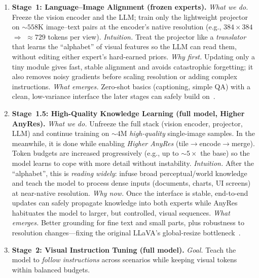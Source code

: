 \begin{enrichment}
\begin{enrichment}
\begin{enumerate}
            \item \textbf{Stage~1: Language--Image Alignment (frozen experts).}
            \emph{What we do.} Freeze the vision encoder and the LLM; train only the lightweight projector on ${\sim}558\text{K}$ image--text pairs at the encoder’s native resolution (e.g., $384{\times}384$ $\Rightarrow$ $\approx729$ tokens per view).  
            \emph{Intuition.} Treat the projector like a \emph{translator} that learns the “alphabet” of visual features so the LLM can read them, without editing either expert’s hard-earned priors.  
            \emph{Why first.} Updating only a tiny module gives fast, stable alignment and avoids catastrophic forgetting; it also removes noisy gradients before scaling resolution or adding complex instructions.  
            \emph{What emerges.} Zero-shot basics (captioning, simple QA) with a clean, low-variance interface the later stages can safely build on~\cite{li2024_llavaonevision}.
            
            \item \textbf{Stage~1.5: High-Quality Knowledge Learning (full model, Higher AnyRes).}
            \emph{What we do.} Unfreeze the full stack (vision encoder, projector, LLM) and continue training on ${\sim}4\text{M}$ \emph{high-quality} single-image samples. In the meanwhile, it is done while enabling \emph{Higher AnyRes} (tile$\rightarrow$encode$\rightarrow$merge). Token budgets are increased progressively (e.g., up to $\sim5{\times}$ the base) so the model learns to cope with more detail without instability.  
            \emph{Intuition.} After the “alphabet”, this is \emph{reading widely}: infuse broad perceptual/world knowledge and teach the model to process dense inputs (documents, charts, UI screens) at near-native resolution.  
            \emph{Why now.} Once the interface is stable, end-to-end updates can safely propagate knowledge into both experts while AnyRes habituates the model to larger, but controlled, visual sequences.  
            \emph{What emerges.} Better grounding for fine text and small parts, plus robustness to resolution changes—fixing the original LLaVA’s global-resize bottleneck~\cite{li2024_llavaonevision}.
            
            \item \textbf{Stage~2: Visual Instruction Tuning (full model).}
            \emph{Goal.} Teach the model to \emph{follow instructions} across scenarios while keeping visual tokens within balanced budgets.
            
            \newpage
            

\end{enumerate}
\end{enrichment}
\end{enrichment}
